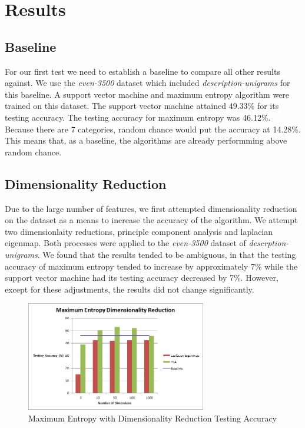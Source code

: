 \section{Results}
\subsection{Baseline}
For our first test we need to establish a baseline to compare all other results against.  We use the \emph{even-3500} dataset which included  \emph{description-unigrams} for this baseline.  A support vector machine and maximum entropy algorithm were trained on this dataset.  The support vector machine attained 49.33\% for its testing accuracy. The testing accuracy for maximum entropy was 46.12\%.  Because there are 7 categories, random chance would put the accuracy at 14.28\%.  This means that, as a baseline, the algorithms are already performming above random chance.

\subsection{Dimensionality Reduction}
Due to the large number of features, we first attempted dimensionality reduction on the dataset as a means to increase the accuracy of the algorithm.  We attempt two dimensionlaity reductions, principle component analysis and laplacian eigenmap. Both processes were applied to the \emph{even-3500} dataset of \emph{descrption-unigrams}.  We found that the results tended to be ambiguous, in that the testing accuracy of maximum entropy tended to increase by approximately 7\% while the support vector machine had its testing accuracy decreased by 7\%.  However, except for these adjustments, the results did not change significantly.
\\

\begin{figure}[!h]
\begin{center}
\caption{Maximum Entropy with Dimensionality Reduction Testing Accuracy}
\includegraphics[width=0.7\textwidth]{Maximum_Entropy_Dimensionality_Reduction.png}
\end{center}
\end{figure}

